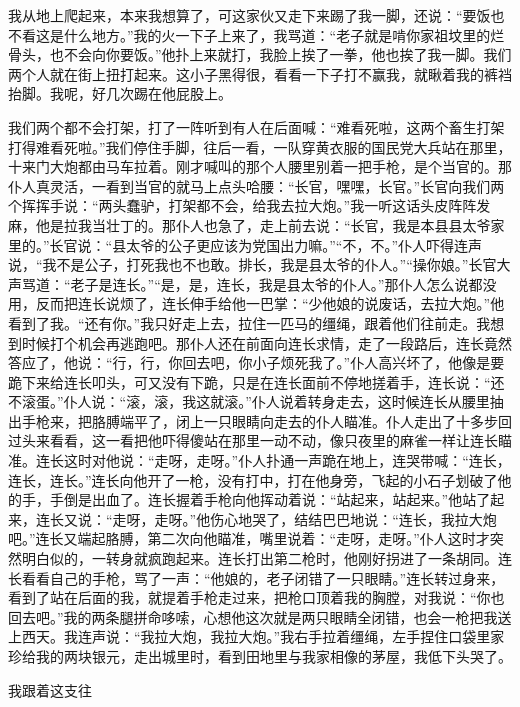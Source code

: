 \documentclass[12pt,UTF8]{ctexbook}
\begin{document}
我从地上爬起来，本来我想算了，可这家伙又走下来踢了我一脚，还说：“要饭也不看这是什么地方。”我的火一下子上来了，我骂道：“老子就是啃你家祖坟里的烂骨头，也不会向你要饭。”他扑上来就打，我脸上挨了一拳，他也挨了我一脚。我们两个人就在街上扭打起来。这小子黑得很，看看一下子打不赢我，就瞅着我的裤裆抬脚。我呢，好几次踢在他屁股上。

我们两个都不会打架，打了一阵听到有人在后面喊：“难看死啦，这两个畜生打架打得难看死啦。”我们停住手脚，往后一看，一队穿黄衣服的国民党大兵站在那里，十来门大炮都由马车拉着。刚才喊叫的那个人腰里别着一把手枪，是个当官的。那仆人真灵活，一看到当官的就马上点头哈腰：“长官，嘿嘿，长官。”长官向我们两个挥挥手说：“两头蠢驴，打架都不会，给我去拉大炮。”我一听这话头皮阵阵发麻，他是拉我当壮丁的。那仆人也急了，走上前去说：“长官，我是本县县太爷家里的。”长官说：“县太爷的公子更应该为党国出力嘛。”“不，不。”仆人吓得连声说，“我不是公子，打死我也不也敢。排长，我是县太爷的仆人。”“操你娘。”长官大声骂道：“老子是连长。”“是，是，连长，我是县太爷的仆人。”那仆人怎么说都没用，反而把连长说烦了，连长伸手给他一巴掌：“少他娘的说废话，去拉大炮。”他看到了我。“还有你。”我只好走上去，拉住一匹马的缰绳，跟着他们往前走。我想到时候打个机会再逃跑吧。那仆人还在前面向连长求情，走了一段路后，连长竟然答应了，他说：“行，行，你回去吧，你小子烦死我了。”仆人高兴坏了，他像是要跪下来给连长叩头，可又没有下跪，只是在连长面前不停地搓着手，连长说：“还不滚蛋。”仆人说：“滚，滚，我这就滚。”仆人说着转身走去，这时候连长从腰里抽出手枪来，把胳膊端平了，闭上一只眼睛向走去的仆人瞄准。仆人走出了十多步回过头来看看，这一看把他吓得傻站在那里一动不动，像只夜里的麻雀一样让连长瞄准。连长这时对他说：“走呀，走呀。”仆人扑通一声跪在地上，连哭带喊：“连长，连长，连长。”连长向他开了一枪，没有打中，打在他身旁，飞起的小石子划破了他的手，手倒是出血了。连长握着手枪向他挥动着说：“站起来，站起来。”他站了起来，连长又说：“走呀，走呀。”他伤心地哭了，结结巴巴地说：“连长，我拉大炮吧。”连长又端起胳膊，第二次向他瞄准，嘴里说着：“走呀，走呀。”仆人这时才突然明白似的，一转身就疯跑起来。连长打出第二枪时，他刚好拐进了一条胡同。连长看看自己的手枪，骂了一声：“他娘的，老子闭错了一只眼睛。”连长转过身来，看到了站在后面的我，就提着手枪走过来，把枪口顶着我的胸膛，对我说：“你也回去吧。”我的两条腿拼命哆嗦，心想他这次就是两只眼睛全闭错，也会一枪把我送上西天。我连声说：“我拉大炮，我拉大炮。”我右手拉着缰绳，左手捏住口袋里家珍给我的两块银元，走出城里时，看到田地里与我家相像的茅屋，我低下头哭了。

我跟着这支往
\end{document}
